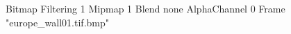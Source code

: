 {Bitmap
	{Filtering 1}
	{Mipmap 1}
	{Blend none}
	{AlphaChannel 0}
	{Frame "europe_wall01.tif.bmp"}
}
